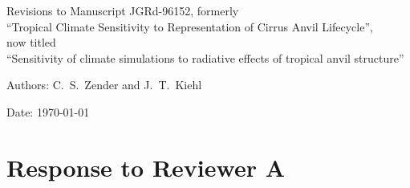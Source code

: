 \documentclass[12pt,twoside]{article}
\begin{document}
 
\begin{center}\normalsize
Revisions to Manuscript JGRd-96152, formerly \\
``Tropical Climate Sensitivity to Representation of Cirrus
Anvil Lifecycle'', \\
now titled \\
``Sensitivity of
climate simulations to radiative effects of tropical anvil structure''
\end{center}
\bigskip
\begin{center}\normalsize
Authors: C.~S.~Zender and J.~T.~Kiehl
\end{center}\normalsize
\bigskip
Date: \today
\bigskip\normalsize

\section{Response to Reviewer A}
\end{document}
